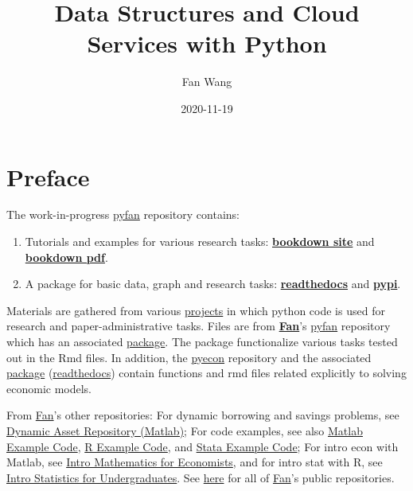 \documentclass[
]{book}
\title{Data Structures and Cloud Services with Python}
\author{Fan Wang}
\date{2020-11-19}
\providecommand{\tightlist}{%
  \setlength{\itemsep}{0pt}\setlength{\parskip}{0pt}}
\begin{document}
\maketitle

{
\hypersetup{linkcolor=}
\setcounter{tocdepth}{2}
\tableofcontents
}
\hypertarget{preface}{%
\chapter*{Preface}\label{preface}}

The work-in-progress \href{https://github.com/FanWangEcon/pyfan}{pyfan} repository contains:

\begin{enumerate}
\def\labelenumi{\arabic{enumi}.}
\tightlist
\item
  Tutorials and examples for various research tasks: \href{https://fanwangecon.github.io/pyfan/bookdown}{\textbf{bookdown site}} and \href{https://fanwangecon.github.io/pyfan/bookdown/Data-Structures-and-Cloud-Services-with-Python.pdf}{\textbf{bookdown pdf}}.
\item
  A package for basic data, graph and research tasks: \href{https://pyfan.readthedocs.io/en/latest/}{\textbf{readthedocs}} and \href{https://pypi.org/project/pyfan/}{\textbf{pypi}}.
\end{enumerate}

Materials are gathered from various \href{https://fanwangecon.github.io/research}{projects} in which python code is used for research and paper-administrative tasks. Files are from \href{https://fanwangecon.github.io/}{\textbf{Fan}}'s \href{https://github.com/FanWangEcon/pyfan}{pyfan} repository which has an associated \href{https://pypi.org/project/pyfan/}{package}. The package functionalize various tasks tested out in the Rmd files. In addition, the \href{https://github.com/FanWangEcon/pyecon}{pyecon} repository and the associated \href{https://pypi.org/project/pyecon/}{package} (\href{https://pyfan.readthedocs.io/en/latest/autoapi/pyfan/index.html\#module-pyfan}{readthedocs}) contain functions and rmd files related explicitly to solving economic models.

From \href{https://fanwangecon.github.io/}{Fan}'s other repositories: For dynamic borrowing and savings problems, see \href{https://fanwangecon.github.io/CodeDynaAsset/}{Dynamic Asset Repository (Matlab)}; For code examples, see also \href{https://fanwangecon.github.io/M4Econ/}{Matlab Example Code}, \href{https://fanwangecon.github.io/R4Econ/}{R Example Code}, and \href{https://fanwangecon.github.io/Stata4Econ/}{Stata Example Code}; For intro econ with Matlab, see \href{https://fanwangecon.github.io/Math4Econ/}{Intro Mathematics for Economists}, and for intro stat with R, see \href{https://fanwangecon.github.io/Stat4Econ/}{Intro Statistics for Undergraduates}. See \href{https://github.com/FanWangEcon}{here} for all of \href{https://fanwangecon.github.io/}{Fan}'s public repositories.
\end{document}
